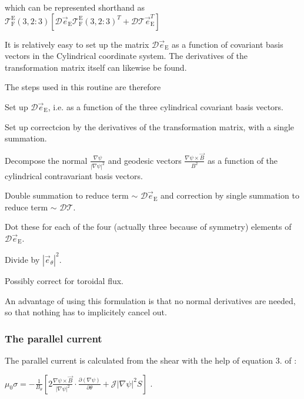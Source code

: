 which can be represented shorthand as $\mathcal{T}_\text{F}^\text{E}\left(3,2:3\right) \left[ \mathcal{D}\vec{e}_\text{E} \mathcal{T}_\text{F}^\text{E}\left(3,2:3\right)^T +\mathcal{D} \mathcal{T} \vec{e}_\text{E}^T \right]$

It is relatively easy to set up the matrix $\mathcal{D}\vec{e}_\text{E}$ as a function of covariant basis vectors in the Cylindrical coordinate system. The derivatives of the transformation matrix itself can likewise be found.

The steps used in this routine are therefore
\begin{DoxyEnumerate}
\item Set up $\mathcal{D}\vec{e}_\text{E}$, i.\+e. as a function of the three cylindrical covariant basis vectors.
\item Set up correctcion by the derivatives of the transformation matrix, with a single summation.
\item Decompose the normal $\frac{\nabla \psi}{\left|\nabla\psi\right|^2}$ and geodesic vectors $\frac{\nabla \psi \times \vec{B}}{B^2}$ as a function of the cylindrical contravariant basis vectors.
\item Double summation to reduce term $\sim$ $\mathcal{D}\vec{e}_\text{E}$ and correction by single summation to reduce term $\sim$ $\mathcal{D}\mathcal{T}$.
\item Dot these for each of the four (actually three because of symmetry) elements of $\mathcal{D}\vec{e}_\text{E}$.
\item Divide by $\left|\vec{e}_\theta\right|^2$.
\item Possibly correct for toroidal flux.
\end{DoxyEnumerate}

An advantage of using this formulation is that no normal derivatives are needed, so that nothing has to implicitely cancel out.

\subsubsection*{The parallel current }

The parallel current is calculated from the shear with the help of equation 3. of \cite{Weyens3D} \+:

$\mu_0 \sigma = -\frac{1}{B_\theta} \left[ 2 \frac{\nabla \psi \times \vec{B}}{\left|\nabla \psi\right|^2} \cdot \frac{\partial \left(\nabla \psi\right)}{\partial \theta} + \mathcal{J} \left|\nabla \psi\right|^2 S \right]$ .

